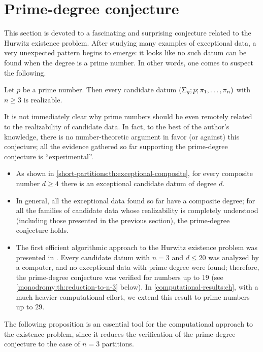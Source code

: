 \section{Prime-degree conjecture}

This section is devoted to a fascinating and surprising conjecture related to the Hurwitz existence problem. After studying many examples of exceptional data, a very unexpected pattern begins to emerge: it looks like no such datum can be found when the degree is a prime number. In other words, one comes to suspect the following.

\begin{prime-degree-conjecture*}
Let $p$ be a prime number. Then every candidate datum $(\Sigma_{g};p;\pi_1,\ldots,\pi_n)$ with $n\ge 3$ is realizable.
\end{prime-degree-conjecture*}

It is not immediately clear why prime numbers should be even remotely related to the realizability of candidate data. In fact, to the best of the author's knowledge, there is no number-theoretic argument in favor (or against) this conjecture; all the evidence gathered so far supporting the prime-degree conjecture is ``experimental''.
\begin{itemize}
\item As shown in \cref{short-partitions:th:exceptional-composite}, for every composite number $d\ge 4$ there is an exceptional candidate datum of degree $d$.
\item In general, all the exceptional data found so far have a composite degree; for all the families of candidate data whose realizability is completely understood (including those presented in the previous section), the prime-degree conjecture holds.
\item The first efficient algorithmic approach to the Hurwitz existence problem was presented in \cite{zheng}. Every candidate datum with $n=3$ and $d\le 20$ was analyzed by a computer, and no exceptional data with prime degree were found; therefore, the prime-degree conjecture was verified for numbers up to $19$ (see \cref{monodromy:th:reduction-to-n-3} below). In \cref{computational-results:ch}, with a much heavier computational effort, we extend this result to prime numbers up to $29$.
\end{itemize}

The following proposition is an essential tool for the computational approach to the existence problem, since it reduces the verification of the prime-degree conjecture to the case of $n=3$ partitions.

